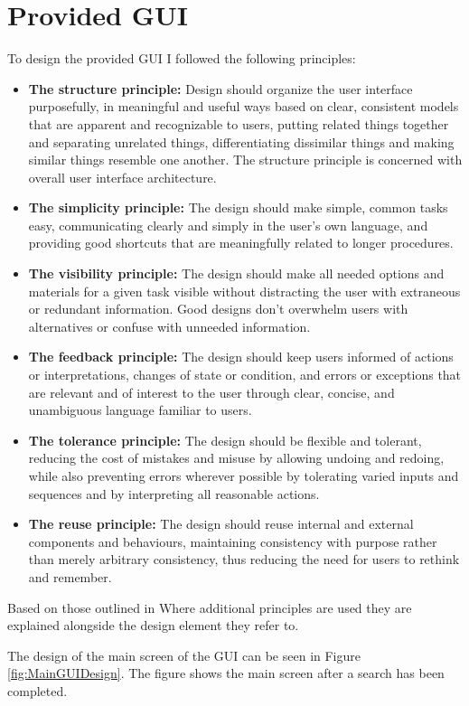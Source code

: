 \section{Provided GUI}
\label{sec:provgui}
To design the provided GUI I followed the following principles:
\begin{itemize}
 \item \textbf{The structure principle:} Design should organize the user interface purposefully, in meaningful and useful ways based on clear, consistent models that are apparent and recognizable to users, putting related things together and separating unrelated things, differentiating dissimilar things and making similar things resemble one another. 
The structure principle is concerned with overall user interface architecture.
\item \textbf{The simplicity principle:} The design should make simple, common tasks easy, communicating clearly and simply in the user's own language, and providing good shortcuts that are meaningfully related to longer procedures.
\item \textbf{The visibility principle:} The design should make all needed options and materials for a given task visible without distracting the user with extraneous or redundant information. 
Good designs don't overwhelm users with alternatives or confuse with unneeded information.
\item \textbf{The feedback principle:} The design should keep users informed of actions or interpretations, changes of state or condition, and errors or exceptions that are relevant and of interest to the user through clear, concise, and unambiguous language familiar to users.
\item \textbf{The tolerance principle:} The design should be flexible and tolerant, reducing the cost of mistakes and misuse by allowing undoing and redoing, while also preventing errors wherever possible by tolerating varied inputs and sequences and by interpreting all reasonable actions.
\item \textbf{The reuse principle:} The design should reuse internal and external components and behaviours, maintaining consistency with purpose rather than merely arbitrary consistency, thus reducing the need for users to rethink and remember.
\end{itemize}
Based on those outlined in \cite{constantine1999software}
Where additional principles are used they are explained alongside the design element they refer to.

The design of the main screen of the GUI can be seen in Figure \ref{fig:MainGUIDesign}.
The figure shows the main screen after a search has been completed.

